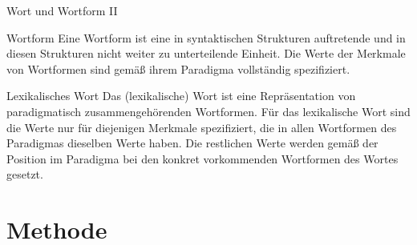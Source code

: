 \begin{frame}
  {Wort und Wortform II}
  \pause
  \begin{block}{Wortform}
    Eine Wortform ist eine in syntaktischen Strukturen auftretende und in diesen Strukturen nicht weiter zu unterteilende Einheit.
    Die Werte der Merkmale von Wortformen sind gemäß ihrem Paradigma vollständig spezifiziert.
  \end{block}
  \Zeile
  \pause
  \begin{block}{Lexikalisches Wort}
    Das (\alert{lexikalische}) \alert{Wort} ist eine Repräsentation von paradigmatisch zusammengehörenden Wortformen.
    Für das lexikalische Wort sind die Werte nur für diejenigen Merkmale spezifiziert, die in allen Wortformen des Paradigmas dieselben Werte haben.
    Die restlichen Werte werden gemäß der Position im Paradigma bei den konkret vorkommenden Wortformen des Wortes gesetzt.
  \end{block}
\end{frame}

\section{Methode}

